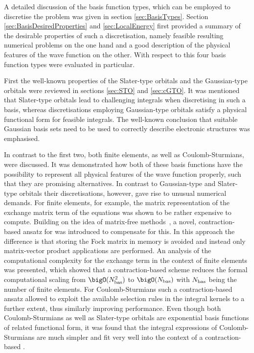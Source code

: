 
A detailed discussion of the basis function types,
which can be employed to discretise the \HF problem
was given in section \ref{sec:BasisTypes}.
Section \ref{sec:BasisDesiredProperties} and \ref{sec:LocalEnergy}
first provided a summary of the desirable properties of such a discretisation,
namely feasible resulting numerical problems on the one hand
and a good description of the physical features of the wave function
on the other.
With respect to this
four basis function types were evaluated in particular.

First the well-known properties of the Slater-type orbitals
and the Gaussian-type orbitals were reviewed
in sections \ref{sec:STO} and \ref{sec:cGTO}.
It was mentioned that Slater-type orbitals lead to challenging
integrals when discretising \HF in such a basis,
whereas discretisations employing Gaussian-type orbitals
satisfy a physical functional form
for feasible integrals.
The well-known conclusion
that suitable Gaussian basis sets need to be used to correctly
describe electronic structures was emphasised.

In contrast to the first two,
both finite elements,
as well as Coulomb-Sturmians,
were discussed.
It was demonstrated how both of these basis functions have the possibility
to represent all physical features of the wave function properly,
such that they are promising alternatives.
In contrast to Gaussian-type and Slater-type orbitals
their discretisations, however,
gave rise to unusual numerical demands.
For finite elements, for example,
the matrix representation of the exchange matrix term of the \HF equations
was shown to be rather expensive to compute.
Building on the idea of matrix-free methods~\cite{Kronbichler2012},
a novel, contraction-based ansatz for \HF was introduced
to compensate for this.
In this approach the difference is that storing the Fock matrix in memory
is avoided and instead only matrix-vector product applications are performed.
An analysis of the computational complexity
for the exchange term in the context of finite elements was presented,
which showed that a contraction-based scheme
reduces the formal computational scaling from $\bigO(\Nbas^2)$
to $\bigO(\Nbas)$ with $N_\text{bas}$ being the number of finite elements.
For Coulomb-Sturmians such a contraction-based \SCF ansatz
allowed to exploit the available selection rules in the integral kernels
to a further extent,
thus similarly improving performance.
Even though both Coulomb-Sturmians as well as Slater-type
orbitals are exponential basis functions
of related functional form,
it was found that the integral expressions of Coulomb-Sturmians are much simpler
and fit very well into the context of a contraction-based \SCF.


